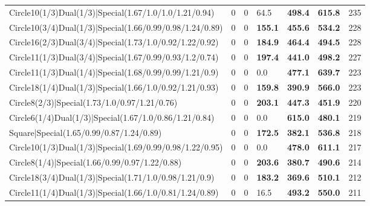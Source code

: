 \begin{tabular}{lrrlllr}
 Circle10(1/3)Dual(1/3)|Special(1.67/1.0/1.0/1.21/0.94)         &          0   &            0   & 64.5           & \textbf{498.4} & \textbf{615.8} &          235 \\
 Circle10(3/4)Dual(1/3)|Special(1.66/0.99/0.98/1.24/0.89)       &          0   &            0   & \textbf{155.1} & \textbf{455.6} & \textbf{534.2} &          228 \\
 Circle16(2/3)Dual(3/4)|Special(1.73/1.0/0.92/1.22/0.92)        &          0   &            0   & \textbf{184.9} & \textbf{464.4} & \textbf{494.5} &          228 \\
 Circle11(1/3)Dual(3/4)|Special(1.67/0.99/0.93/1.2/0.74)        &          0   &            0   & \textbf{197.4} & \textbf{441.0} & \textbf{498.2} &          227 \\
 Circle11(1/3)Dual(1/4)|Special(1.68/0.99/0.99/1.21/0.9)        &          0   &            0   & 0.0            & \textbf{477.1} & \textbf{639.7} &          223 \\
 Circle18(1/4)Dual(1/3)|Special(1.66/1.0/0.92/1.21/0.93)        &          0   &            0   & \textbf{159.8} & \textbf{390.9} & \textbf{566.0} &          223 \\
 Circle8(2/3)|Special(1.73/1.0/0.97/1.21/0.76)                  &          0   &            0   & \textbf{203.1} & \textbf{447.3} & \textbf{451.9} &          220 \\
 Circle6(1/4)Dual(1/3)|Special(1.67/1.0/0.86/1.21/0.84)         &          0   &            0   & 0.0            & \textbf{615.0} & \textbf{480.1} &          219 \\
 Square|Special(1.65/0.99/0.87/1.24/0.89)                       &          0   &            0   & \textbf{172.5} & \textbf{382.1} & \textbf{536.8} &          218 \\
 Circle10(1/3)Dual(1/3)|Special(1.69/0.99/0.98/1.22/0.95)       &          0   &            0   & 0.0            & \textbf{478.0} & \textbf{611.1} &          217 \\
 Circle8(1/4)|Special(1.66/0.99/0.97/1.22/0.88)                 &          0   &            0   & \textbf{203.6} & \textbf{380.7} & \textbf{490.6} &          214 \\
 Circle18(3/4)Dual(1/3)|Special(1.71/1.0/0.98/1.21/0.9)         &          0   &            0   & \textbf{183.2} & \textbf{369.6} & \textbf{510.1} &          212 \\
 Circle11(1/4)Dual(1/3)|Special(1.66/1.0/0.81/1.24/0.89)        &          0   &            0   & 16.5           & \textbf{493.2} & \textbf{550.0} &          211 \\

\end{tabular}
